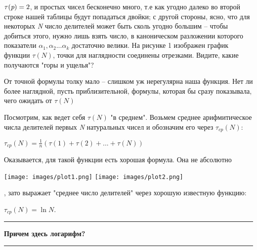 \documentclass{article}
\begin{document}
\small
\begin{multicols*}{3}
\noindent$\tau(\emph{p}) = 2$, и простых чисел бесконечно много, т.е как угодно далеко во второй строке нашей таблицы будут попадаться двойки; с другой стороны, ясно, что для некоторых \emph{N} число делителей может быть сколь угодно большим -- чтобы добиться этого, нужно лишь взять число, в каноническом разложении которого показатели 
\begin{math}
\alpha_1, \alpha_2 ... \alpha_k
\end{math} достаточно велики.
На рисунке 1 изображен график функции \begin{math}
    \tau(N)
\end{math}, точки для наглядности соединены отрезками. Видите, какие получаются "горы и ущелья"?

От точной формулы толку мало -- слишком уж нерегулярна наша функция. Нет ли более наглядной, пусть приблизительной, формулы, которая бы сразу показывала, чего ожидать от \begin{math}
    \tau(N)
\end{math}

Посмотрим, как ведет себя \begin{math}
    \tau(N)
\end{math} "в среднем". Возьмем среднее арифмитическое числа делителей первых \emph{N} натуральных чисел и обозначим его через \begin{math}
    \tau_{cp}(N):
\end{math} 

\begin{math}
     \tau_{cp}(N) = \frac{1}{n}(\tau(1) + \tau(2) + ... + \tau(N))
\end{math}

Оказывается, для такой функции есть хорошая формула. Она не абсолютно

\noindent\texttt{[image: images/plot1.png]}
\texttt{[image: images/plot2.png]}

\vspace{30px}

, зато выражает "среднее число делителей" через хорошую известную функцию:

\begin{math}
    \tau_{cp}(N) = \ln N
\end{math}.

\noindent\rule{5.5cm}{0.5pt}

\noindent\large{\textbf{Причем здесь логарифм?}}
\noindent\rule{5.5cm}{0.5pt}


\end{multicols*}
\end{document}
